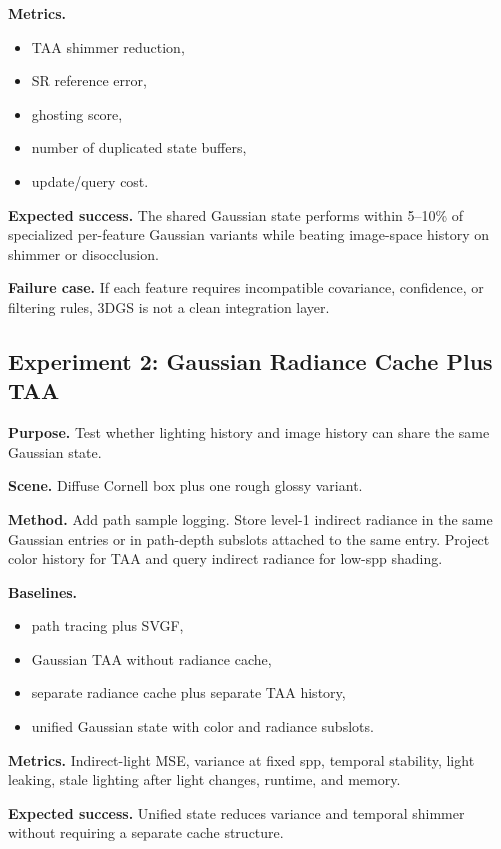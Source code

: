 \documentclass[11pt]{article}
\begin{document}
\textbf{Metrics.}

\begin{itemize}
  \item TAA shimmer reduction,
  \item SR reference error,
  \item ghosting score,
  \item number of duplicated state buffers,
  \item update/query cost.
\end{itemize}

\textbf{Expected success.} The shared Gaussian state performs within 5--10\%
of specialized per-feature Gaussian variants while beating image-space history
on shimmer or disocclusion.

\textbf{Failure case.} If each feature requires incompatible covariance,
confidence, or filtering rules, 3DGS is not a clean integration layer.

\subsection{Experiment 2: Gaussian Radiance Cache Plus TAA}

\textbf{Purpose.} Test whether lighting history and image history can share
the same Gaussian state.

\textbf{Scene.} Diffuse Cornell box plus one rough glossy variant.

\textbf{Method.} Add path sample logging. Store level-1 indirect radiance in
the same Gaussian entries or in path-depth subslots attached to the same entry.
Project color history for TAA and query indirect radiance for low-spp shading.

\textbf{Baselines.}

\begin{itemize}
  \item path tracing plus SVGF,
  \item Gaussian TAA without radiance cache,
  \item separate radiance cache plus separate TAA history,
  \item unified Gaussian state with color and radiance subslots.
\end{itemize}

\textbf{Metrics.} Indirect-light MSE, variance at fixed spp, temporal stability,
light leaking, stale lighting after light changes, runtime, and memory.

\textbf{Expected success.} Unified state reduces variance and temporal shimmer
without requiring a separate cache structure.
\end{document}
